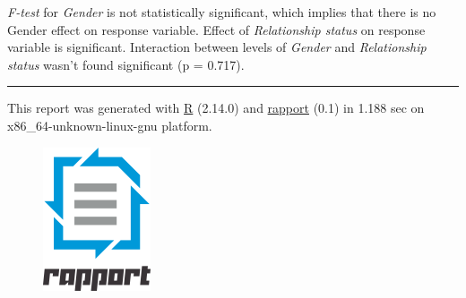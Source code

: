 \documentclass[]{article}
\makeatletter
\def\maxwidth{\ifdim\Gin@nat@width>\linewidth\linewidth
\else\Gin@nat@width\fi}
\let\Oldincludegraphics\includegraphics
\renewcommand{\includegraphics}[1]{\Oldincludegraphics[width=\maxwidth]{#1}}
\makeatother
\begin{document}
\emph{F-test} for \emph{Gender} is not statistically significant, which
implies that there is no Gender effect on response variable. Effect of
\emph{Relationship status} on response variable is significant.
Interaction between levels of \emph{Gender} and \emph{Relationship
status} wasn't found significant (p = 0.717).

\begin{center}\rule{3in}{0.4pt}\end{center}

This report was generated with \href{http://www.r-project.org/}{R}
(2.14.0) and \href{http://al3xa.github.com/rapport/}{rapport} (0.1) in
1.188 sec on x86\_64-unknown-linux-gnu platform.

\begin{figure}[htbp]
\centering
\includegraphics{images/logo.png}
\caption{}
\end{figure}
\end{document}

